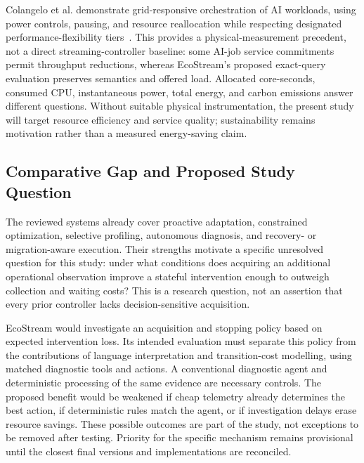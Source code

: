 Colangelo et al. demonstrate grid-responsive orchestration of AI workloads, using power controls, pausing, and resource reallocation while respecting designated performance-flexibility tiers~\cite{colangelo2026grid}. This provides a physical-measurement precedent, not a direct streaming-controller baseline: some AI-job service commitments permit throughput reductions, whereas EcoStream's proposed exact-query evaluation preserves semantics and offered load. Allocated core-seconds, consumed CPU, instantaneous power, total energy, and carbon emissions answer different questions. Without suitable physical instrumentation, the present study will target resource efficiency and service quality; sustainability remains motivation rather than a measured energy-saving claim.

\subsection{Comparative Gap and Proposed Study Question}
The reviewed systems already cover proactive adaptation, constrained optimization, selective profiling, autonomous diagnosis, and recovery- or migration-aware execution. Their strengths motivate a specific unresolved question for this study: under what conditions does acquiring an additional operational observation improve a stateful intervention enough to outweigh collection and waiting costs? This is a research question, not an assertion that every prior controller lacks decision-sensitive acquisition.

EcoStream would investigate an acquisition and stopping policy based on expected intervention loss. Its intended evaluation must separate this policy from the contributions of language interpretation and transition-cost modelling, using matched diagnostic tools and actions. A conventional diagnostic agent and deterministic processing of the same evidence are necessary controls. The proposed benefit would be weakened if cheap telemetry already determines the best action, if deterministic rules match the agent, or if investigation delays erase resource savings. These possible outcomes are part of the study, not exceptions to be removed after testing. Priority for the specific mechanism remains provisional until the closest final versions and implementations are reconciled.

